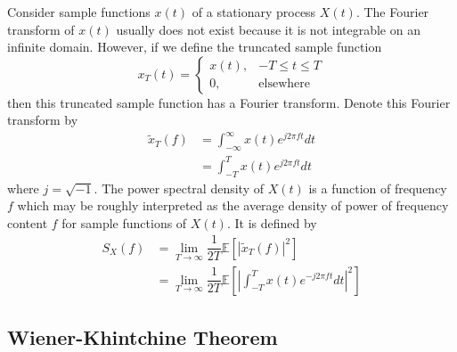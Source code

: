 \documentclass[11pt]{report} %
\begin{document}
Consider sample functions $x\left(t\right)$ of a stationary process $X\left(t\right)$. The Fourier transform of $x\left(t\right)$ usually does not exist because it is not integrable on an infinite domain. However, if we define the truncated sample function
\begin{equation}
x_{T}\left(t\right) = \begin{cases} x\left(t\right), & -T\leq t\leq T \\ 0, & \mathrm{elsewhere}\end{cases}
\end{equation}
then this truncated sample function has a Fourier transform. Denote this Fourier transform by
\begin{align}
\widetilde{x}_{T}\left(f\right) &= \int_{-\infty}^{\infty}x\left(t\right)e^{j2\pi ft}dt \\
&= \int_{-T}^{T}x\left(t\right)e^{j2\pi ft}dt
\end{align}
where $j = \sqrt{-1}$. The power spectral density of $X\left(t\right)$ is a function of frequency $f$ which may be roughly interpreted as the average density of power of frequency content $f$ for sample functions of $X\left(t\right)$. It is defined by
\begin{align}
S_{X}\left(f\right) &= \lim_{T\to\infty}\dfrac{1}{2T}\mathbb{E}\left[\left|\widetilde{x}_{T}\left(f\right)\right|^{2}\right] \\
&= \lim_{T\to\infty}\dfrac{1}{2T}\mathbb{E}\left[\left|\int_{-T}^{T}x\left(t\right)e^{-j2\pi ft}dt\right|^{2}\right]
\end{align}

\subsection{Wiener-Khintchine Theorem}
\end{document}
